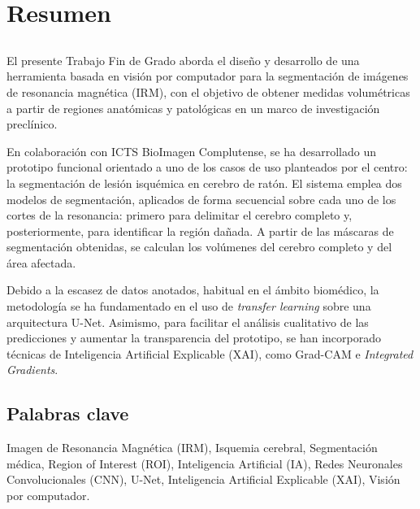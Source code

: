 \chapter*{Resumen}

\section*{\tituloPortadaVal}

El presente Trabajo Fin de Grado aborda el diseño y desarrollo de una herramienta basada en visión por computador para la segmentación de imágenes de resonancia magnética (IRM), con el objetivo de obtener medidas volumétricas a partir de regiones anatómicas y patológicas en un marco de investigación preclínico.

En colaboración con ICTS BioImagen Complutense, se ha desarrollado un prototipo funcional orientado a uno de los casos de uso planteados por el centro: la segmentación de lesión isquémica en cerebro de ratón. El sistema emplea dos modelos de segmentación, aplicados de forma secuencial sobre cada uno de los cortes de la resonancia: primero para delimitar el cerebro completo y, posteriormente, para identificar la región dañada. A partir de las máscaras de segmentación obtenidas, se calculan los volúmenes del cerebro completo y del área afectada.

Debido a la escasez de datos anotados, habitual en el ámbito biomédico, la metodología se ha fundamentado en el uso de \textit{transfer learning} sobre una arquitectura U-Net. Asimismo, para facilitar el análisis cualitativo de las predicciones y aumentar la transparencia del prototipo, se han incorporado técnicas de Inteligencia Artificial Explicable (XAI), como Grad-CAM e \textit{Integrated Gradients}.
\section*{Palabras clave}

\noindent Imagen de Resonancia Magnética (IRM), Isquemia cerebral, Segmentación médica, Region of Interest (ROI), Inteligencia Artificial (IA), Redes Neuronales Convolucionales (CNN), U-Net, Inteligencia Artificial Explicable (XAI), Visión por computador.



